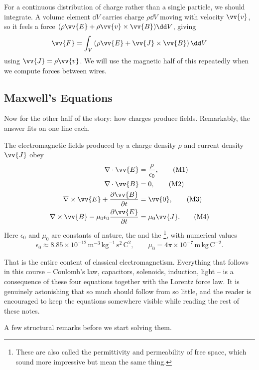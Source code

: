 For a continuous distribution of charge rather than a single particle, we should integrate. A volume element $\dd V$ carries charge $\rho \dd V$ moving with velocity $\vv{v}$, so it feels a force $(\rho \vv{E} + \rho \vv{v}\times \vv{B})\dd V$, giving
$$
\vv{F} = \int_V \left(\rho \vv{E} + \vv{J} \times \vv{B}\right) \dd V
$$
using $\vv{J} = \rho \vv{v}$. We will use the magnetic half of this repeatedly when we compute forces between wires.

\subsection{Maxwell's Equations}

Now for the other half of the story: how charges produce fields. Remarkably, the answer fits on one line each.

\begin{law}
	\label{law:maxwell}
	The electromagnetic fields produced by a charge density $\rho$ and current density $\vv{J}$ obey
	\begin{align*}
		\nabla \cdot \vv{E} &= \frac{\rho}{\epsilon_0}, \tag{M1}\\
		\nabla \cdot \vv{B} &= 0, \tag{M2}\\
		\nabla \times \vv{E} + \frac{\partial \vv{B}}{\partial t} &= \vv{0}, \tag{M3}\\
		\nabla \times \vv{B} - \mu_0 \epsilon_0 \frac{\partial \vv{E}}{\partial t} &= \mu_0 \vv{J}. \tag{M4}
	\end{align*}
	Here $\epsilon_0$ and $\mu_0$ are constants of nature, the  and the \footnote{These are also called the permittivity and permeability of free space, which sound more impressive but mean the same thing.}, with numerical values
	$$
	\epsilon_0 \approx 8.85 \times 10^{-12}\,\mathrm{m}^{-3}\,\mathrm{kg}^{-1}\,\mathrm{s}^{2}\,\mathrm{C}^{2}, \qquad \mu_0 = 4\pi \times 10^{-7}\,\mathrm{m}\,\mathrm{kg}\,\mathrm{C}^{-2}.
	$$
\end{law}

That is the entire content of classical electromagnetism. Everything that follows in this course -- Coulomb's law, capacitors, solenoids, induction, light -- is a consequence of these four equations together with the Lorentz force law. It is genuinely astonishing that so much should follow from so little, and the reader is encouraged to keep the equations somewhere visible while reading the rest of these notes.

A few structural remarks before we start solving them.


